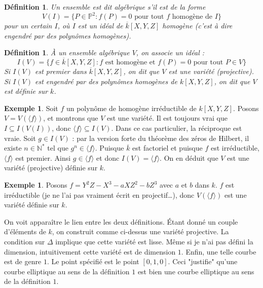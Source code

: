 \documentclass{article}
\theoremstyle{plain}%
\newtheorem{deff}[thm]{Définition}
\theoremstyle{definition}%
\newtheorem{ex}[thm]{Exemple}
\newcommand{\N}{\mathbb{N}}
\begin{document}
\begin{deff}
  Un ensemble est dit algébrique s'il est de la forme $$V(I) = \{ P\in \mathbb{P}^2 : f(P) = 0 \text{ pour tout } f \text{ homogène de } I \}$$ pour un certain $I$, où $I$ est un idéal de $\overline{k}[X, Y, Z]$ homogène (c'est à dire engendré par des polynômes homogènes).
\end{deff}

\begin{deff}
  À un ensemble algébrique $V$, on associe un idéal :
  $$I(V) = \{ f\in \overline{k}[X, Y, Z] : f \text{ est homogène et } f(P) = 0 \text{ pour tout } P\in V \}$$
  Si $I(V)$ est premier dans $ \overline{k}[X, Y, Z] $, on dit que $V$ est une variété (projective). Si $I(V)$ est engendré par des polynômes homogènes de $k[X, Y, Z]$, on dit que $V$ est définie sur $k$.  
\end{deff}



\begin{ex}
  Soit $f$ un polynôme de homogène irréductible de $k[X, Y, Z]$. Posons $V = V(\langle f \rangle)$, et montrons que $V$ est une variété. 
  Il est toujours vrai que $I \subseteq I(V(I))$, donc $\langle f \rangle \subseteq I(V)$. 
  Dans ce cas particulier, la réciproque est vraie. Soit $g\in I(V)$ : par la version forte du théorème des zéros de Hilbert, il existe $n\in\N^*$ tel que $g^n\in \langle f \rangle$.
  Puisque $\overline{k}$ est factoriel et puisque $f$ est irréductible,  $\langle f \rangle$ est premier. Ainsi $g\in \langle f \rangle$ et donc $I(V) = \langle f \rangle$.
  On en déduit que $V$ est une variété (projective) définie sur $k$.
\end{ex}

\begin{ex}
  Posons $f = Y^2 Z - X^3 -aXZ^2 -b Z^3$ avec $a$ et $b$ dans $k$. $f$ est irréductible (je ne l'ai pas vraiment écrit en projectif\ldots), donc $V(\langle f \rangle)$ est une variété définie sur $k$.
\end{ex}

On voit apparaître le lien entre les deux définitions. Étant donné un couple d'éléments de $k$, on construit comme ci-dessus une variété projective. La condition sur $\Delta$ implique que cette variété est lisse. Même si je n'ai pas défini la dimension, intuitivement cette variété est de dimension $1$. Enfin, une telle courbe est de genre $1$. Le point spécifié est le point $[0, 1, 0]$. Ceci "justifie" qu'une courbe elliptique au sens de la définition $1$ est bien une courbe elliptique au sens de la définition $1$. 
\end{document}
